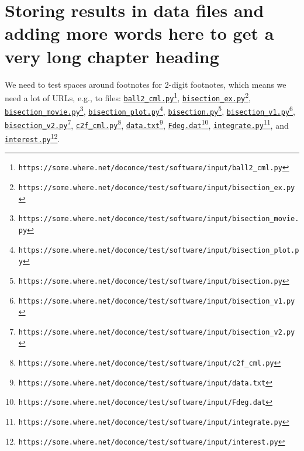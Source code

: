 \documentclass[graybox,sectrefs,envcountresetchap,open=right,final]{svmonodo}
\begin{document}
\chapter{Storing results in data files and adding more words here to get a very long chapter heading}
We need to test spaces around footnotes for 2-digit footnotes, which
means we need a lot of URLs, e.g., to files:
\href{{https://some.where.net/doconce/test/software/input/ball2_cml.py}}{\nolinkurl{ball2_cml.py}\footnote{\texttt{https://some.where.net/doconce/test/software/input/ball2\_cml.py}}},
\href{{https://some.where.net/doconce/test/software/input/bisection_ex.py}}{\nolinkurl{bisection_ex.py}\footnote{\texttt{https://some.where.net/doconce/test/software/input/bisection\_ex.py}}},
\href{{https://some.where.net/doconce/test/software/input/bisection_movie.py}}{\nolinkurl{bisection_movie.py}\footnote{\texttt{https://some.where.net/doconce/test/software/input/bisection\_movie.py}}},
\href{{https://some.where.net/doconce/test/software/input/bisection_plot.py}}{\nolinkurl{bisection_plot.py}\footnote{\texttt{https://some.where.net/doconce/test/software/input/bisection\_plot.py}}},
\href{{https://some.where.net/doconce/test/software/input/bisection.py}}{\nolinkurl{bisection.py}\footnote{\texttt{https://some.where.net/doconce/test/software/input/bisection.py}}},
\href{{https://some.where.net/doconce/test/software/input/bisection_v1.py}}{\nolinkurl{bisection_v1.py}\footnote{\texttt{https://some.where.net/doconce/test/software/input/bisection\_v1.py}}},
\href{{https://some.where.net/doconce/test/software/input/bisection_v2.py}}{\nolinkurl{bisection_v2.py}\footnote{\texttt{https://some.where.net/doconce/test/software/input/bisection\_v2.py}}},
\href{{https://some.where.net/doconce/test/software/input/c2f_cml.py}}{\nolinkurl{c2f_cml.py}\footnote{\texttt{https://some.where.net/doconce/test/software/input/c2f\_cml.py}}},
\href{{https://some.where.net/doconce/test/software/input/data.txt}}{\nolinkurl{data.txt}\footnote{\texttt{https://some.where.net/doconce/test/software/input/data.txt}}},
\href{{https://some.where.net/doconce/test/software/input/Fdeg.dat}}{\nolinkurl{Fdeg.dat}\footnote{\texttt{https://some.where.net/doconce/test/software/input/Fdeg.dat}}},
\href{{https://some.where.net/doconce/test/software/input/integrate.py}}{\nolinkurl{integrate.py}\footnote{\texttt{https://some.where.net/doconce/test/software/input/integrate.py}}}, and
\href{{https://some.where.net/doconce/test/software/input/interest.py}}{\nolinkurl{interest.py}\footnote{\texttt{https://some.where.net/doconce/test/software/input/interest.py}}}.
\end{document}

